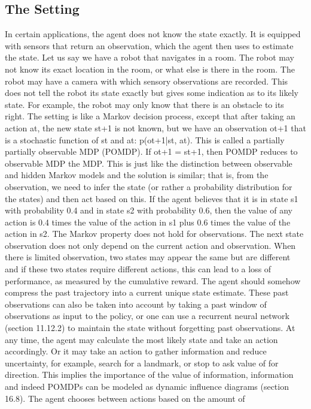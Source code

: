 \subsection{The Setting}

In certain applications, the agent does not know the state exactly. It is equipped with sensors that return an observation, which the agent then uses to estimate the state. Let us say we have a robot that navigates in a room. The robot may not know its exact location in the room, or what else is there in the room. The robot may have a camera with which sensory observations are recorded. This does not tell the robot its state exactly but gives some indication as to its likely state. For example, the robot may only know that there is an obstacle to its right. The setting is like a Markov decision process, except that after taking an action at, the new state st+1 is not known, but we have an observation ot+1 that is a stochastic function of st and at: p(ot+1|st, at). This is called a partially partially observable MDP (POMDP). If ot+1 = st+1, then POMDP reduces to observable MDP the MDP. This is just like the distinction between observable and hidden Markov models and the solution is similar; that is, from the observation, we need to infer the state (or rather a probability distribution for the states) and then act based on this. If the agent believes that it is in state s1 with probability 0.4 and in state s2 with probability 0.6, then the value of any action is 0.4 times the value of the action in s1 plus 0.6 times the value of the action in s2. The Markov property does not hold for observations. The next state observation does not only depend on the current action and observation. When there is limited observation, two states may appear the same but are different and if these two states require different actions, this can lead to a loss of performance, as measured by the cumulative reward. The agent should somehow compress the past trajectory into a current unique state estimate. These past observations can also be taken into account by taking a past window of observations as input to the policy, or one can use a recurrent neural network (section 11.12.2) to maintain the state without forgetting past observations. At any time, the agent may calculate the most likely state and take an action accordingly. Or it may take an action to gather information and reduce uncertainty, for example, search for a landmark, or stop to ask value of for direction. This implies the importance of the value of information, information and indeed POMDPs can be modeled as dynamic influence diagrams (section 16.8). The agent chooses between actions based on the amount of

